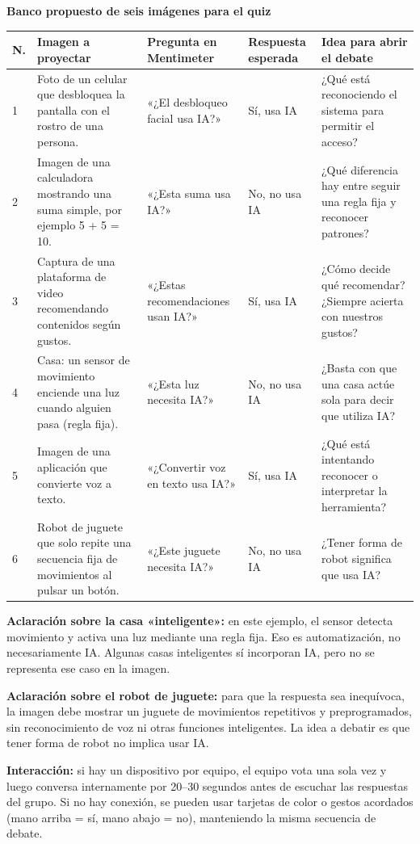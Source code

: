 \documentclass[11pt,a4paper]{article}
\begin{document}
\textbf{Banco propuesto de seis imágenes para el quiz}
\begin{longtable}{@{}p{0.75cm}p{3.8cm}p{3.1cm}p{2.3cm}p{4.0cm}@{}}
\toprule \textbf{N.} & \textbf{Imagen a proyectar} & \textbf{Pregunta en Mentimeter} & \textbf{Respuesta esperada} & \textbf{Idea para abrir el debate}\\\midrule\endhead
1 & Foto de un celular que desbloquea la pantalla con el rostro de una persona. & «¿El desbloqueo facial usa IA?» & Sí, usa IA & ¿Qué está reconociendo el sistema para permitir el acceso?\\
2 & Imagen de una calculadora mostrando una suma simple, por ejemplo 5 + 5 = 10. & «¿Esta suma usa IA?» & No, no usa IA & ¿Qué diferencia hay entre seguir una regla fija y reconocer patrones?\\
3 & Captura de una plataforma de video recomendando contenidos según gustos. & «¿Estas recomendaciones usan IA?» & Sí, usa IA & ¿Cómo decide qué recomendar? ¿Siempre acierta con nuestros gustos?\\
4 & Casa: un sensor de movimiento enciende una luz cuando alguien pasa (regla fija). & «¿Esta luz necesita IA?» & No, no usa IA & ¿Basta con que una casa actúe sola para decir que utiliza IA?\\
5 & Imagen de una aplicación que convierte voz a texto. & «¿Convertir voz en texto usa IA?» & Sí, usa IA & ¿Qué está intentando reconocer o interpretar la herramienta?\\
6 & Robot de juguete que solo repite una secuencia fija de movimientos al pulsar un botón. & «¿Este juguete necesita IA?» & No, no usa IA & ¿Tener forma de robot significa que usa IA?\\
\bottomrule
\end{longtable}

\textbf{Aclaración sobre la casa «inteligente»:} en este ejemplo, el sensor detecta movimiento y activa una luz mediante una regla fija. Eso es automatización, no necesariamente IA. Algunas casas inteligentes sí incorporan IA, pero no se representa ese caso en la imagen.

\textbf{Aclaración sobre el robot de juguete:} para que la respuesta sea inequívoca, la imagen debe mostrar un juguete de movimientos repetitivos y preprogramados, sin reconocimiento de voz ni otras funciones inteligentes. La idea a debatir es que tener forma de robot no implica usar IA.

\textbf{Interacción:} si hay un dispositivo por equipo, el equipo vota una sola vez y luego conversa internamente por 20--30 segundos antes de escuchar las respuestas del grupo. Si no hay conexión, se pueden usar tarjetas de color o gestos acordados (mano arriba = sí, mano abajo = no), manteniendo la misma secuencia de debate.
\end{document}
